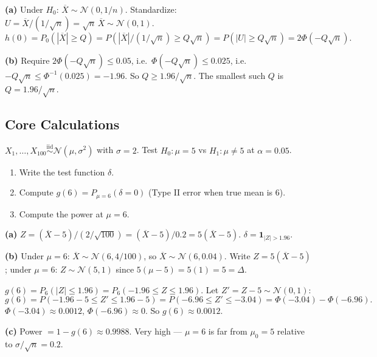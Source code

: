 \documentclass[11pt,a4paper]{article}
\newcommand{\iid}{\overset{\text{iid}}{\sim}}
\newenvironment{solution}{%
  \begin{tcolorbox}[answerbox, title={Solution}]
}{%
  \end{tcolorbox}
}
\newcounter{quizq}
\newenvironment{quizquestion}[1]{%
  \refstepcounter{quizq}%
  \begin{tcolorbox}[quizbox, title={Quiz Question \thequizq\ --- #1}]
}{%
  \end{tcolorbox}
}
\begin{document}
\begin{solution}
\textbf{(a)} Under $H_0$: $\overline{X}\sim\mathcal{N}(0,1/n)$. Standardize: $U=\overline{X}/(1/\sqrt{n})=\sqrt{n}\,\overline{X}\sim\mathcal{N}(0,1)$.
\[
h(0) = P_0(|\overline{X}|\geq Q) = P(|\overline{X}|/(1/\sqrt{n})\geq Q\sqrt{n}) = P(|U|\geq Q\sqrt{n}) = 2\Phi(-Q\sqrt{n}).
\]

\textbf{(b)} Require $2\Phi(-Q\sqrt{n})\leq 0.05$, i.e.\ $\Phi(-Q\sqrt{n})\leq 0.025$, i.e.\ $-Q\sqrt{n}\leq\Phi^{-1}(0.025)=-1.96$.
So $Q\geq 1.96/\sqrt{n}$. The smallest such $Q$ is $Q=1.96/\sqrt{n}$.
\end{solution}

\subsection{Core Calculations}

\begin{quizquestion}{Type II error for bilateral test}
$X_1,\ldots,X_{100}\iid\mathcal{N}(\mu,\sigma^2)$ with $\sigma=2$. Test $H_0:\mu=5$ vs $H_1:\mu\neq 5$ at $\alpha=0.05$.
\begin{enumerate}[label=(\alph*)]
  \item Write the test function $\delta$.
  \item Compute $g(6) = P_{\mu=6}(\delta=0)$ (Type II error when true mean is 6).
  \item Compute the power at $\mu=6$.
\end{enumerate}
\end{quizquestion}

\begin{solution}
\textbf{(a)} $Z=(\overline{X}-5)/(2/\sqrt{100})=(\overline{X}-5)/0.2=5(\overline{X}-5)$.
$\delta = \mathbf{1}_{|Z|>1.96}$.

\textbf{(b)} Under $\mu=6$: $\overline{X}\sim\mathcal{N}(6, 4/100)$, so $\overline{X}\sim\mathcal{N}(6,0.04)$.
Write $Z=5(\overline{X}-5)$; under $\mu=6$: $Z\sim\mathcal{N}(5,1)$ since $5(\mu-5)=5(1)=5=\Delta$.

$g(6) = P_6(|Z|\leq 1.96) = P_6(-1.96\leq Z\leq 1.96)$.
Let $Z'=Z-5\sim\mathcal{N}(0,1)$:
\[
g(6) = P(-1.96-5\leq Z'\leq 1.96-5) = P(-6.96\leq Z'\leq -3.04) = \Phi(-3.04)-\Phi(-6.96).
\]
$\Phi(-3.04)\approx 0.0012$, $\Phi(-6.96)\approx 0$. So $g(6)\approx 0.0012$.

\textbf{(c)} Power $=1-g(6)\approx 0.9988$. Very high --- $\mu=6$ is far from $\mu_0=5$ relative to $\sigma/\sqrt{n}=0.2$.
\end{solution}
\end{document}
